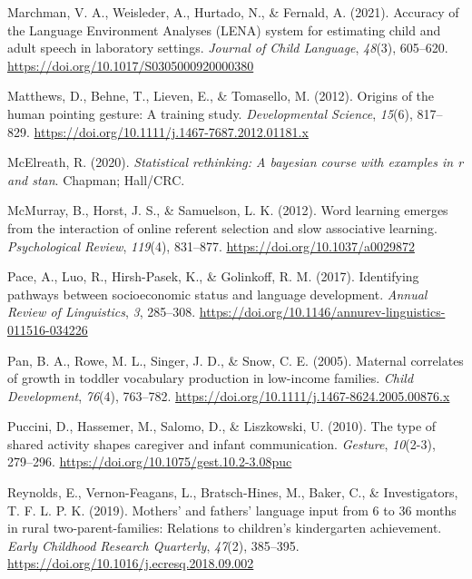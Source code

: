 \documentclass[
  english,
  man,floatsintext]{apa6}
\begin{document}
\leavevmode\hypertarget{ref-marchman_accuracy_2021}{}%
Marchman, V. A., Weisleder, A., Hurtado, N., \& Fernald, A. (2021). Accuracy of the Language Environment Analyses (LENA) system for estimating child and adult speech in laboratory settings. \emph{Journal of Child Language}, \emph{48}(3), 605--620. \url{https://doi.org/10.1017/S0305000920000380}

\leavevmode\hypertarget{ref-matthews_origins_2012}{}%
Matthews, D., Behne, T., Lieven, E., \& Tomasello, M. (2012). Origins of the human pointing gesture: A training study. \emph{Developmental Science}, \emph{15}(6), 817--829. \url{https://doi.org/10.1111/j.1467-7687.2012.01181.x}

\leavevmode\hypertarget{ref-mcelreath_statistical_2020}{}%
McElreath, R. (2020). \emph{Statistical rethinking: A bayesian course with examples in r and stan}. Chapman; Hall/CRC.

\leavevmode\hypertarget{ref-mcmurray_word_2012}{}%
McMurray, B., Horst, J. S., \& Samuelson, L. K. (2012). Word learning emerges from the interaction of online referent selection and slow associative learning. \emph{Psychological Review}, \emph{119}(4), 831--877. \url{https://doi.org/10.1037/a0029872}

\leavevmode\hypertarget{ref-pace_identifying_2017}{}%
Pace, A., Luo, R., Hirsh-Pasek, K., \& Golinkoff, R. M. (2017). Identifying pathways between socioeconomic status and language development. \emph{Annual Review of Linguistics}, \emph{3}, 285--308. \url{https://doi.org/10.1146/annurev-linguistics-011516-034226}

\leavevmode\hypertarget{ref-pan_maternal_2005}{}%
Pan, B. A., Rowe, M. L., Singer, J. D., \& Snow, C. E. (2005). Maternal correlates of growth in toddler vocabulary production in low-income families. \emph{Child Development}, \emph{76}(4), 763--782. \url{https://doi.org/10.1111/j.1467-8624.2005.00876.x}

\leavevmode\hypertarget{ref-puccini_type_2010}{}%
Puccini, D., Hassemer, M., Salomo, D., \& Liszkowski, U. (2010). The type of shared activity shapes caregiver and infant communication. \emph{Gesture}, \emph{10}(2-3), 279--296. \url{https://doi.org/10.1075/gest.10.2-3.08puc}

\leavevmode\hypertarget{ref-reynolds_mothers_2019}{}%
Reynolds, E., Vernon-Feagans, L., Bratsch-Hines, M., Baker, C., \& Investigators, T. F. L. P. K. (2019). Mothers' and fathers' language input from 6 to 36 months in rural two-parent-families: Relations to children's kindergarten achievement. \emph{Early Childhood Research Quarterly}, \emph{47}(2), 385--395. \url{https://doi.org/10.1016/j.ecresq.2018.09.002}
\end{document}
